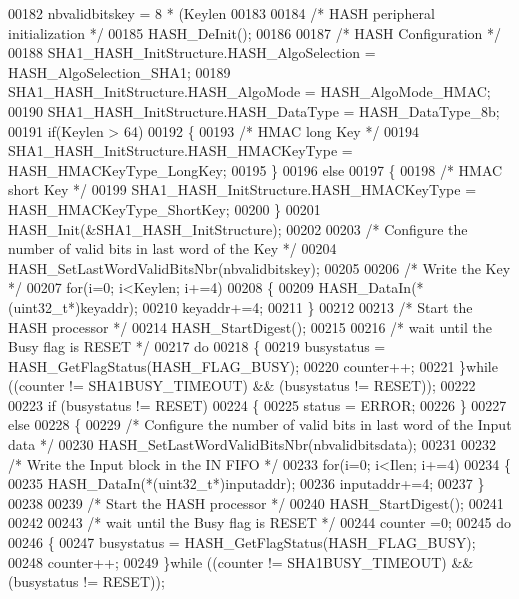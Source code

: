 \begin{DoxyCode}
00182   nbvalidbitskey = 8 * (Keylen %
00183 
00184   \textcolor{comment}{/* HASH peripheral initialization */}
00185   HASH_DeInit();
00186 
00187   \textcolor{comment}{/* HASH Configuration */}
00188   SHA1\_HASH\_InitStructure.HASH\_AlgoSelection = HASH_AlgoSelection_SHA1;
00189   SHA1\_HASH\_InitStructure.HASH\_AlgoMode = HASH_AlgoMode_HMAC;
00190   SHA1\_HASH\_InitStructure.HASH\_DataType = HASH_DataType_8b;
00191   \textcolor{keywordflow}{if}(Keylen > 64)
00192   \{
00193     \textcolor{comment}{/* HMAC long Key */}
00194     SHA1\_HASH\_InitStructure.HASH\_HMACKeyType = HASH_HMACKeyType_LongKey;
00195   \}
00196   \textcolor{keywordflow}{else}
00197   \{
00198     \textcolor{comment}{/* HMAC short Key */}
00199     SHA1\_HASH\_InitStructure.HASH\_HMACKeyType = HASH_HMACKeyType_ShortKey;
00200   \}
00201   HASH_Init(&SHA1\_HASH\_InitStructure);
00202 
00203   \textcolor{comment}{/* Configure the number of valid bits in last word of the Key */}
00204   HASH\_SetLastWordValidBitsNbr(nbvalidbitskey);
00205 
00206   \textcolor{comment}{/* Write the Key */}
00207   \textcolor{keywordflow}{for}(i=0; i<Keylen; i+=4)
00208   \{
00209     HASH\_DataIn(*(uint32\_t*)keyaddr);
00210     keyaddr+=4;
00211   \}
00212 
00213   \textcolor{comment}{/* Start the HASH processor */}
00214   HASH_StartDigest();
00215 
00216   \textcolor{comment}{/* wait until the Busy flag is RESET */}
00217   \textcolor{keywordflow}{do}
00218   \{
00219     busystatus = HASH\_GetFlagStatus(HASH_FLAG_BUSY);
00220     counter++;
00221   \}\textcolor{keywordflow}{while} ((counter != SHA1BUSY_TIMEOUT) && (busystatus != RESET));
00222 
00223   \textcolor{keywordflow}{if} (busystatus != RESET)
00224   \{
00225      status = ERROR;
00226   \}
00227   \textcolor{keywordflow}{else}
00228   \{
00229     \textcolor{comment}{/* Configure the number of valid bits in last word of the Input data */}
00230     HASH\_SetLastWordValidBitsNbr(nbvalidbitsdata);
00231 
00232     \textcolor{comment}{/* Write the Input block in the IN FIFO */}
00233     \textcolor{keywordflow}{for}(i=0; i<Ilen; i+=4)
00234     \{
00235       HASH\_DataIn(*(uint32\_t*)inputaddr);
00236       inputaddr+=4;
00237     \}
00238 
00239     \textcolor{comment}{/* Start the HASH processor */}
00240     HASH\_StartDigest();
00241 
00242 
00243     \textcolor{comment}{/* wait until the Busy flag is RESET */}
00244     counter =0;
00245     \textcolor{keywordflow}{do}
00246     \{
00247       busystatus = HASH\_GetFlagStatus(HASH_FLAG_BUSY);
00248       counter++;
00249     \}\textcolor{keywordflow}{while} ((counter != SHA1BUSY_TIMEOUT) && (busystatus != RESET));

\end{DoxyCode}
